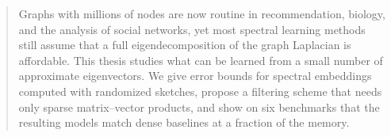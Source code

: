 \begin{abstract}
Graphs with millions of nodes are now routine in recommendation, biology, and the analysis of social networks, yet most spectral learning methods still assume that a full eigendecomposition of the graph Laplacian is affordable. This thesis studies what can be learned from a small number of approximate eigenvectors. We give error bounds for spectral embeddings computed with randomized sketches, propose a filtering scheme that needs only sparse matrix--vector products, and show on six benchmarks that the resulting models match dense baselines at a fraction of the memory.
\end{abstract}
